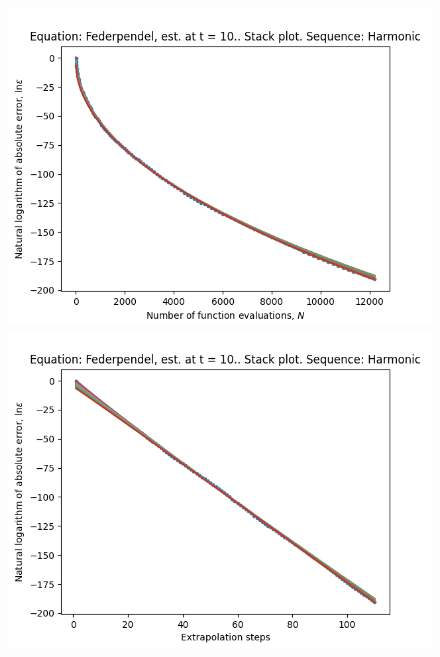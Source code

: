 \begin{figure}[H]
\centering
\begin{minipage}{0.45\textwidth}
\centering
\includegraphics[scale=0.45]{../results/emr_plots/federpendel_10_hp_harmonic_stack.png}
\end{minipage}
\begin{minipage}{0.45\textwidth}
\centering
\includegraphics[scale=0.45]{../results/emr_plots/federpendel_10_hp_harmonic_steps_stack.png}
\end{minipage}
\end{figure}

